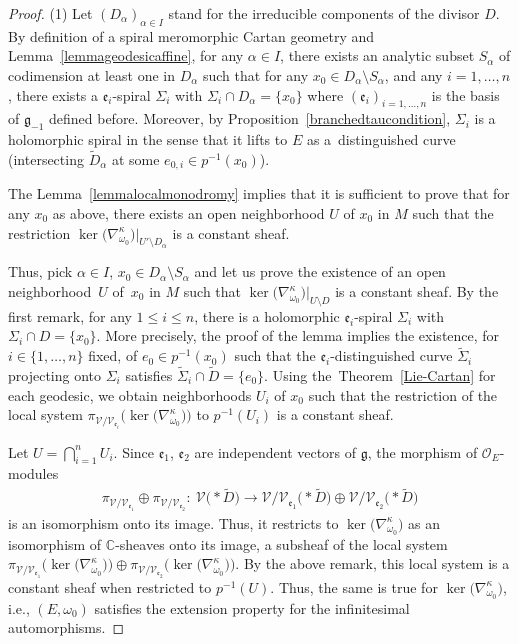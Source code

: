 \documentclass[10pt,a4paper]{amsart}
\numberwithin{equation}{section}
\begin{document}
\begin{proof} (1) Let $(D_\alpha)_{\alpha\in I}$ stand for the irreducible components of the divisor $D$. By definition of a spiral meromorphic Cartan geometry and Lemma~\ref{lemmageodesicaffine}, for any $\alpha\in I$, there exists an analytic subset $S_\alpha$ of codimension at least one in $D_\alpha$ such that for any $x_0\in D_\alpha\setminus S_\alpha$, and any $i=1,\dots,n$, there exists a $\mathfrak{e}_i$-spiral $\Sigma_i$ with $\Sigma_i\cap D_\alpha=\{x_0\}$ where $(\mathfrak{e}_i)_{i=1,\dots,n}$ is the basis of $\mathfrak{g}_{-1}$ defined before. Moreover, by Proposition~\ref{branchedtaucondition}, $\Sigma_i$ is a holomorphic spiral in the sense that it lifts to $E$ as a~distinguished curve (intersecting $\tilde{D}_\alpha$ at some $e_{0,i}\in p^{-1}(x_0)$).

The Lemma~\ref{lemmalocalmonodromy} implies that it is sufficient to prove that for any $x_0$ as above, there exists an open neighborhood $U$ of $x_0$ in $M$ such that the restriction $\ker\big(\nabla^\kappa_{\omega_0}\big)|_{U'\setminus D_\alpha}$ is a constant sheaf.

Thus, pick $\alpha \in I$, $x_0 \in D_\alpha\setminus S_\alpha$ and let us prove the existence of an open neighborhood~$U$ of~$x_0$ in $M$ such that $\ker\big(\nabla^\kappa_{\omega_0}\big)|_{U\setminus D}$ is a constant sheaf. By the first remark, for any $1\leq i\leq n$, there is a holomorphic $\mathfrak{e}_i$-spiral $\Sigma_i$ with $\Sigma_i \cap D=\{x_0\}$. More precisely, the proof of the lemma implies the existence, for $i\in \{1,\dots,n\}$ fixed, of $e_0\in p^{-1}(x_0)$ such that the $\mathfrak{e}_i$-distinguished curve $\tilde{\Sigma}_i$ projecting onto $\Sigma_i$ satisfies $\tilde{\Sigma}_i \cap \tilde{D}=\{e_0\}$. Using the~Theorem~\ref{Lie-Cartan} for each geodesic, we obtain neighborhoods $U_i$ of $x_0$ such that the restriction of the local system $\pi_{\mathcal{V}/\mathcal{V}_{\mathfrak{e}_i}}\bigl(\ker\bigl(\nabla^\kappa_{\omega_0}\bigr)\bigr)$ to $p^{-1}(U_i)$ is a constant sheaf.

Let $U=\bigcap_{i=1}^{n} U_i$. Since $\mathfrak{e}_1$, $\mathfrak{e}_2$ are independent vectors of $\mathfrak{g}$, the morphism of $\mathcal{O}_E$-modules
\begin{align}\label{piV1V2}
 \pi_{\mathcal{V}/\mathcal{V}_{\mathfrak{e}_1}} \oplus \pi_{\mathcal{V}/\mathcal{V}_{\mathfrak{e}_2}}\colon \ \mathcal{V}\bigl(* \tilde{D}\bigr) \longrightarrow \mathcal{V}/\mathcal{V}_{\mathfrak{e}_1}\bigl(* \tilde{D}\bigr) \oplus \mathcal{V}/\mathcal{V}_{\mathfrak{e}_2}\bigl(* \tilde{D}\bigr) \end{align}
 is an isomorphism onto its image. Thus, it restricts to $\ker\big(\nabla^\kappa_{\omega_0}\big)$ as an isomorphism of $\mathbb{C}$-sheaves onto its image, a subsheaf of the local system $\pi_{\mathcal{V}/\mathcal{V}_{\mathfrak{e}_1}}\!\big( \ker\big(\nabla^\kappa_{\omega_0}\big)\big) \oplus \pi_{\mathcal{V}/\mathcal{V}_{\mathfrak{e}_2}}\!\big(\ker\big(\nabla^\kappa_{\omega_0}\big)\big)$. By the above remark, this local system is a constant sheaf when restricted to $p^{-1}(U)$. Thus, the same is true for $\ker\big(\nabla^\kappa_{\omega_0}\big)$, i.e., $(E,\omega_0)$ satisfies the extension property for the infinitesimal automorphisms.


\end{proof}
\end{document}
